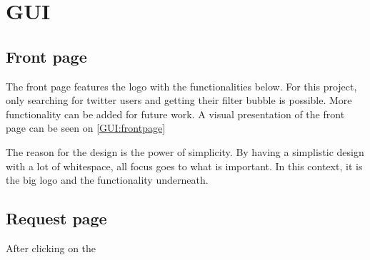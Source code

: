 \chapter{GUI} \label{GUI} 
\section{Front page}
The front page features the logo with the functionalities below. For this
project, only searching for twitter users and getting their filter bubble is
possible. More functionality can be added for future work. A visual presentation
of the front page can be seen on \autoref{GUI:frontpage}

{}

The reason for the design is the power of simplicity. By having a simplistic
design with a lot of whitespace, all focus goes to what is important. In this
context, it is the big logo and the functionality underneath.
\citep[p. 26 & 32]{WebUI}

\section{Request page}
After clicking on the 
